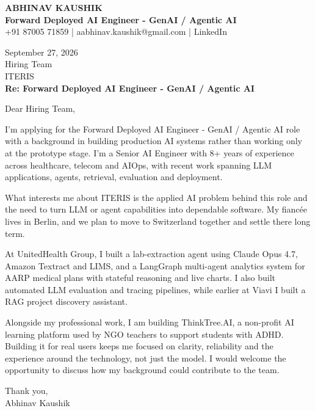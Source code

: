 \documentclass[10pt,a4paper]{article}
\begin{document}
\begin{center}
{\Large\bfseries ABHINAV KAUSHIK}\\[2pt]
{\bfseries Forward Deployed AI Engineer - GenAI / Agentic AI}\\[2pt]
+91 87005 71859 \quad | \quad aabhinav.kaushik@gmail.com \quad | \quad LinkedIn
\end{center}
\vspace{8pt}
September 27, 2026\\[6pt]
Hiring Team\\
ITERIS\\[4pt]
\textbf{Re: Forward Deployed AI Engineer - GenAI / Agentic AI}

Dear Hiring Team,

I’m applying for the Forward Deployed AI Engineer - GenAI / Agentic AI role with a background in building production AI systems rather than working only at the prototype stage. I’m a Senior AI Engineer with 8+ years of experience across healthcare, telecom and AIOps, with recent work spanning LLM applications, agents, retrieval, evaluation and deployment.

What interests me about ITERIS is the applied AI problem behind this role and the need to turn LLM or agent capabilities into dependable software. My fiancée lives in Berlin, and we plan to move to Switzerland together and settle there long term.

At UnitedHealth Group, I built a lab-extraction agent using Claude Opus 4.7, Amazon Textract and LIMS, and a LangGraph multi-agent analytics system for AARP medical plans with stateful reasoning and live charts. I also built automated LLM evaluation and tracing pipelines, while earlier at Viavi I built a RAG project discovery assistant.

Alongside my professional work, I am building ThinkTree.AI, a non-profit AI learning platform used by NGO teachers to support students with ADHD. Building it for real users keeps me focused on clarity, reliability and the experience around the technology, not just the model. I would welcome the opportunity to discuss how my background could contribute to the team.

Thank you,\\
Abhinav Kaushik
\end{document}
